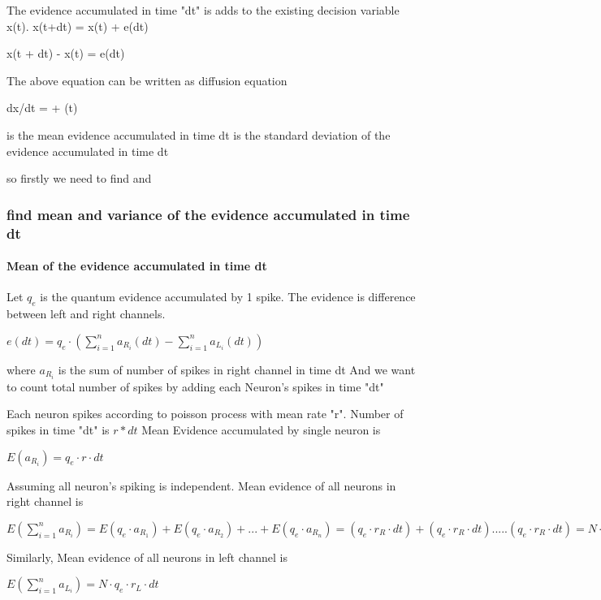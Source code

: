 The evidence accumulated in time "dt" is adds to the existing decision variable x(t).
x(t+dt) = x(t) + e(dt)

x(t + dt) - x(t) = e(dt)

The above equation can be written as diffusion equation

dx/dt = \mu + \sigma \eta(t)

\mu is the mean evidence accumulated in time dt
\sigma is the standard deviation of the evidence accumulated in time dt

so firstly we need to find \mu and \sigma




\subsubsection{find mean and variance of the evidence accumulated in time dt}

\paragraph{Mean of the evidence accumulated in time dt}
Let $q_e$ is the quantum evidence accumulated by 1 spike. The evidence is difference between left and right
channels.

$e(dt) =  q_e \cdot (\sum_{i=1}^{n} a_R_i(dt)  - \sum_{i=1}^{n} a_L_i(dt)) $

where $a_R_i$ is the sum of number of spikes in right channel in time dt
And we want to count total number of spikes by adding each Neuron's spikes in time "dt"

Each neuron spikes according to poisson process with mean rate "r". Number of spikes in time "dt" is $r*dt$
Mean Evidence accumulated by single neuron is

$E(a_R_i) = q_e \cdot r \cdot dt$

Assuming all neuron's spiking is independent. Mean evidence of all neurons in right channel is

$E(\sum_{i=1}^{n} a_R_i) = E(q_e \cdot a_R_1) + E(q_e \cdot a_R_2) + ... + E(q_e \cdot a_R_n) 
                         = (q_e \cdot r_R \cdot dt) + (q_e \cdot r_R \cdot dt) ..... (q_e \cdot r_R \cdot dt)
                         = N \cdot q_e \cdot r_R \cdot dt$

Similarly, Mean evidence of all neurons in left channel is

$E(\sum_{i=1}^{n} a_L_i) = N \cdot q_e \cdot r_L \cdot dt$

